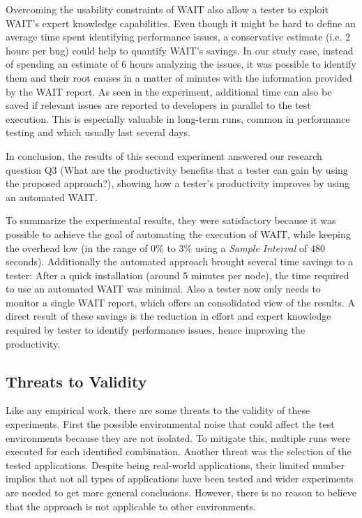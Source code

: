 \documentclass[runningheads,a4paper]{llncs}
\begin{document}
Overcoming the usability constraints of WAIT also allow a tester to exploit
WAIT's expert knowledge capabilities. Even though it might be hard to define an
average time spent identifying performance issues, a conservative estimate (i.e.
2 hours per bug) could help to quantify WAIT's savings. In our study case,
instead of spending an estimate of 6 hours analyzing the issues, it was possible to
identify them and their root causes in a matter of minutes with the information
provided by the WAIT report. As seen in the experiment, additional time can also
be saved if relevant issues are reported to developers in parallel to the test
execution. This is especially valuable in long-term runs, common in performance
testing and which usually last several days.

In conclusion, the results of this second experiment answered our research
question Q3 (What are the productivity benefits that a tester can gain by using the
proposed approach?), showing how a tester's productivity improves by using an
automated WAIT.

To summarize the experimental results, they were satisfactory because it
was possible to achieve the goal of automating the execution of WAIT,
while keeping the overhead low (in the range of 0\% to 3\% using a \emph{Sample
Interval} of 480 seconds). Additionally the automated approach brought several
time savings to a tester: After a quick installation (around 5 minutes per node), the
time required to use an automated WAIT was minimal. Also a tester now only
needs to monitor a single WAIT report, which offers an consolidated view of the
results. A direct result of these savings is the reduction in effort and expert
knowledge required by tester to identify performance issues, hence improving the
productivity.

\vspace{-5pt}
\subsection{Threats to Validity}
\vspace{-5pt}
Like any empirical work, there are some threats to the validity of these
experiments. First the possible environmental noise that could affect the test
environments because they are not isolated. To mitigate this, multiple runs were
executed for each identified combination. Another threat was the selection of
the tested applications. Despite being real-world applications, their limited
number implies that not all types of applications have been tested and wider
experiments are needed to get more general conclusions. However, there is no
reason to believe that the approach is not applicable to other environments.
\end{document}
